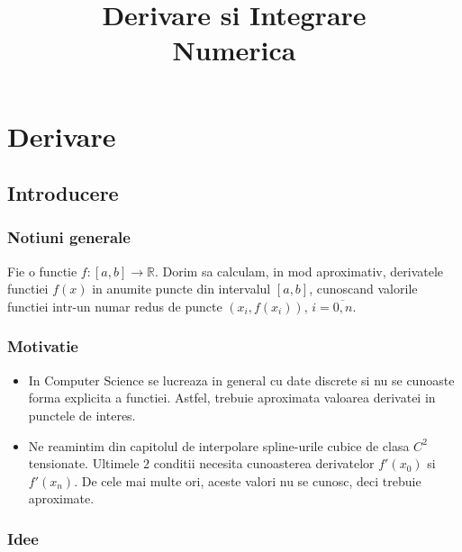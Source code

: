 \documentclass{article}
\title{Derivare si Integrare \\ Numerica}
\author{}
\date{}
\begin{document}
\maketitle

\section{Derivare}


\subsection{Introducere}

\subsubsection{Notiuni generale}
\tab Fie o functie $f:[a,b]\rightarrow\mathbb{R}$. Dorim sa calculam, in mod aproximativ, derivatele functiei $f(x)$ in anumite puncte din intervalul $[a,b]$, cunoscand valorile functiei intr-un numar redus de puncte $(x_i, f(x_i)), \, i = \overline{0, n}$.


\subsubsection{Motivatie}
\begin{itemize}
    \item In Computer Science se lucreaza in general cu date discrete si nu se cunoaste forma explicita a functiei. Astfel, trebuie aproximata valoarea derivatei in punctele de interes.
    \item Ne reamintim din capitolul de interpolare spline-urile cubice de clasa $C^2$ tensionate. Ultimele $2$ conditii necesita cunoasterea derivatelor $f'(x_0)$ si $f'(x_n)$. De cele mai multe ori, aceste valori nu se cunosc, deci trebuie aproximate.
\end{itemize} 


\subsubsection{Idee}
\end{document}
